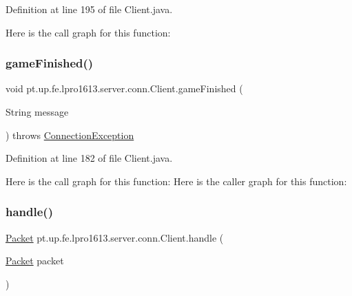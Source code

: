 Definition at line 195 of file Client.\+java.

Here is the call graph for this function\+:
\hypertarget{classpt_1_1up_1_1fe_1_1lpro1613_1_1server_1_1conn_1_1_client_a58789376953d4b6f316a48627dffbae1}{}\label{classpt_1_1up_1_1fe_1_1lpro1613_1_1server_1_1conn_1_1_client_a58789376953d4b6f316a48627dffbae1} 
\subsubsection{\texorpdfstring{game\+Finished()}{gameFinished()}}
{\footnotesize\ttfamily void pt.\+up.\+fe.\+lpro1613.\+server.\+conn.\+Client.\+game\+Finished (\begin{DoxyParamCaption}\item[{String}]{message }\end{DoxyParamCaption}) throws \hyperlink{classpt_1_1up_1_1fe_1_1lpro1613_1_1sharedlib_1_1exceptions_1_1_connection_exception}{Connection\+Exception}}



Definition at line 182 of file Client.\+java.

Here is the call graph for this function\+:
Here is the caller graph for this function\+:
\hypertarget{classpt_1_1up_1_1fe_1_1lpro1613_1_1server_1_1conn_1_1_client_a81efbd1e6b06189da5c814ac767a4a98}{}\label{classpt_1_1up_1_1fe_1_1lpro1613_1_1server_1_1conn_1_1_client_a81efbd1e6b06189da5c814ac767a4a98} 
\subsubsection{\texorpdfstring{handle()}{handle()}}
{\footnotesize\ttfamily \hyperlink{classpt_1_1up_1_1fe_1_1lpro1613_1_1sharedlib_1_1conn_1_1_packet}{Packet} pt.\+up.\+fe.\+lpro1613.\+server.\+conn.\+Client.\+handle (\begin{DoxyParamCaption}\item[{\hyperlink{classpt_1_1up_1_1fe_1_1lpro1613_1_1sharedlib_1_1conn_1_1_packet}{Packet}}]{packet }\end{DoxyParamCaption})}


